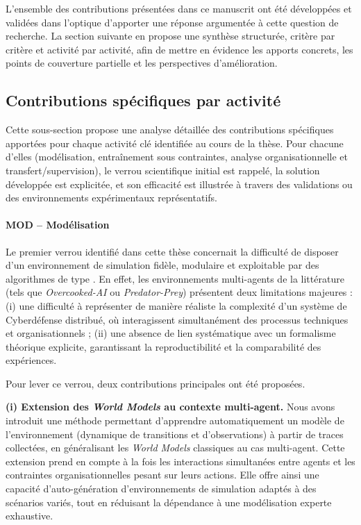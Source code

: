 L'ensemble des contributions présentées dans ce manuscrit ont été développées et validées dans l'optique d'apporter une réponse argumentée à cette question de recherche. La section suivante en propose une synthèse structurée, critère par critère et activité par activité, afin de mettre en évidence les apports concrets, les points de couverture partielle et les perspectives d'amélioration.


\subsection*{Contributions spécifiques par activité}

Cette sous-section propose une analyse détaillée des contributions spécifiques apportées pour chaque activité clé identifiée au cours de la thèse. Pour chacune d'elles (modélisation, entraînement sous contraintes, analyse organisationnelle et transfert/supervision), le verrou scientifique initial est rappelé, la solution développée est explicitée, et son efficacité est illustrée à travers des validations ou des environnements expérimentaux représentatifs.

\paragraph{MOD – Modélisation}

Le premier verrou identifié dans cette thèse concernait la difficulté de disposer d'un environnement de simulation fidèle, modulaire et exploitable par des algorithmes de type .
En effet, les environnements multi-agents de la littérature (tels que \textit{Overcooked-AI} ou \textit{Predator-Prey}) présentent deux limitations majeures :
(i) une difficulté à représenter de manière réaliste la complexité d'un système de Cyberdéfense distribué, où interagissent simultanément des processus techniques et organisationnels ;
(ii) une absence de lien systématique avec un formalisme théorique explicite, garantissant la reproductibilité et la comparabilité des expériences.

Pour lever ce verrou, deux contributions principales ont été proposées.

\medskip
\noindent
\textbf{(i) Extension des \textit{World Models} au contexte multi-agent.}
Nous avons introduit une méthode permettant d'apprendre automatiquement un modèle de l'environnement (dynamique de transitions et d'observations) à partir de traces collectées, en généralisant les \textit{World Models} classiques au cas multi-agent.
Cette extension prend en compte à la fois les interactions simultanées entre agents et les contraintes organisationnelles pesant sur leurs actions.
Elle offre ainsi une capacité d'auto-génération d'environnements de simulation adaptés à des scénarios variés, tout en réduisant la dépendance à une modélisation experte exhaustive.

